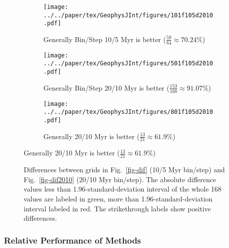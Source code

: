 \begin{figure}[tbp]
  \captionsetup{singlelinecheck=false,justification=raggedright,aboveskip=-6pt,belowskip=-6pt}
  \centering
  \begin{subfigure}{1\textwidth}
    \texttt{[image: ../../paper/tex/GeophysJInt/figures/101f105d2010.pdf]}
    \caption{Generally Bin/Step 10/5 Myr is better
      ($\frac{59}{84}\approx70.24\%$)}\label{fig-101f105d2010}
  \end{subfigure}
  \vspace{.1em}
  \begin{subfigure}{1\textwidth}
    \texttt{[image: ../../paper/tex/GeophysJInt/figures/501f105d2010.pdf]}
    \caption{Generally Bin/Step 20/10 Myr is better
      ($\frac{153}{168}\approx91.07\%$)}\label{fig-501f105d2010}
  \end{subfigure}
  \vspace{.1em}
  \begin{subfigure}{1\textwidth}
    \texttt{[image: ../../paper/tex/GeophysJInt/figures/801f105d2010.pdf]}
    \caption{Generally 20/10 Myr is better
      ($\frac{13}{21}\approx61.9\%$)}\label{fig-801f105d2010}
  \end{subfigure}
\end{figure}
\begin{figure}[!ht]
  \ContinuedFloat\caption[Differences between grids in Fig.~\ref{fig-dif} (10/5 Myr bin/step)
    and Fig.~\ref{fig-dif2010} (20/10 Myr bin/step)]{Differences between grids in Fig.~\ref{fig-dif} (10/5 Myr bin/step)
    and Fig.~\ref{fig-dif2010} (20/10 Myr bin/step). The absolute difference
    values less than 1.96-standard-deviation interval of the whole 168 values
    are labeled in green, more than 1.96-standard-deviation interval labeled in
    red. The strikethrough labels show positive differences.}\label{fig-f105d2010}
\end{figure}

\subsubsection{Relative Performance of Methods}

